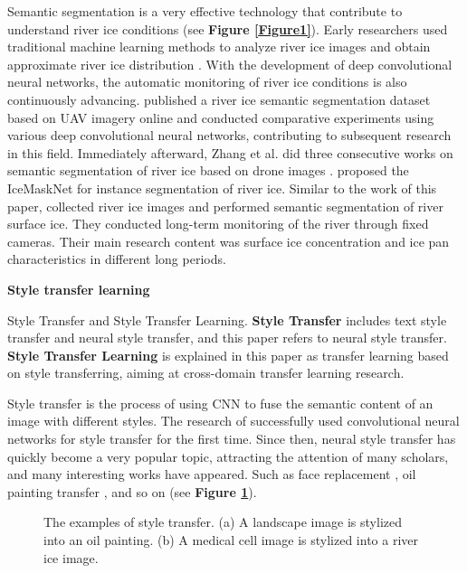 \documentclass[a4paper,fleqn]{cas-dc}
\begin{document}
Semantic segmentation is a very effective technology that contribute to understand river ice conditions (see \textbf{Figure \ref{Figure1}}). Early researchers used traditional machine learning methods to analyze river ice images and obtain approximate river ice distribution \cite{Unterschultz_van_der_Sanden_Hicks_2009, Ansari_Rennie_Seidou_Malenchak_Zare_2017, Kalke_Loewen_2018, Daigle_Berube_Bergeron_Matte_2013}. With the development of deep convolutional neural networks, the automatic monitoring of river ice conditions is also continuously advancing. \cite{Singh_Kalke_Loewen_Ray_2020} published a river ice semantic segmentation dataset based on UAV imagery online and conducted comparative experiments using various deep convolutional neural networks, contributing to subsequent research in this field. Immediately afterward, Zhang et al. did  three consecutive works on semantic segmentation of river ice based on drone images \cite{Zhang_Jin_Lan_Li_Fan_Wang_Yu_Zhang_2020, Zhang_Zhou_Jin_Wang_Fan_Wang_Zhang_2021, Zhang_Zhao_Ran_Xing_Wang_Lan_Yin_He_Liu_Zhang_et_al_2023} . \cite{Ansari_Rennie_Clark_Seidou_2021} proposed the IceMaskNet for instance segmentation of river ice. Similar to the work of this paper, \cite{Pei_She_Loewen_2022} collected river ice images and performed semantic segmentation of river surface ice. They conducted long-term monitoring of the river through fixed cameras. Their main research content was surface ice concentration and ice pan characteristics in different long periods.

\textbf{Style transfer learning}

Style Transfer and Style Transfer Learning. \textbf{Style Transfer} includes text style transfer and neural style transfer, and this paper refers to neural style transfer. \textbf{Style Transfer Learning} is explained in this paper as transfer learning based on style transferring, aiming at cross-domain transfer learning research.

Style transfer is the process of using CNN to fuse the semantic content of an image with different styles. The research of \cite{Gatys_Ecker_Bethge_2016} successfully used convolutional neural networks for style transfer for the first time. Since then, neural style transfer has quickly become a very popular topic, attracting the attention of many scholars, and many interesting works have appeared. Such as face replacement \cite{Karras_Laine_Aila_2019}, oil painting transfer \cite{Liu_Lin_He_Li_Deng_Li_Ding_Wang_2021}, and so on (see \textbf{Figure \ref{Figure2}}).
\begin{figure}[h]
	\centering
	\caption{The examples of style transfer. (a) A landscape image is stylized into an oil painting. (b) A medical cell image is stylized into a river ice image.}\label{Figure2}
\end{figure}
\end{document}
